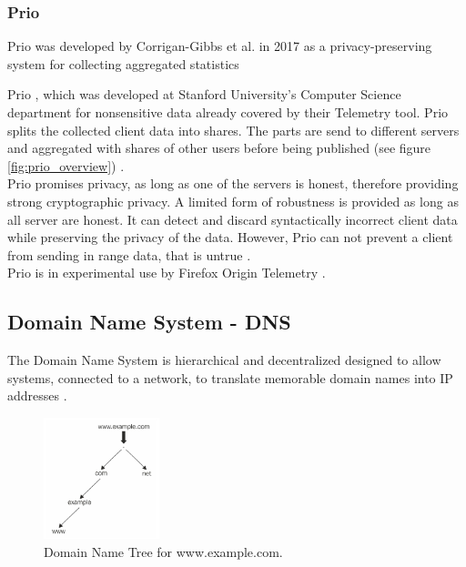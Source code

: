    \subsubsection{Prio}

        Prio was developed by Corrigan-Gibbs et al. \cite{corrigan-gibbs_prio_2017} in 2017 as a privacy-preserving
        system for collecting aggregated statistics
        
        Prio \cite{corrigan-gibbs_prio_2017}, which was developed at Stanford University's Computer Science department for nonsensitive data already covered by their Telemetry tool. 
        Prio splits the collected client data into shares. 
        The parts are send to different servers and aggregated with shares of other users before being published (see figure \ref{fig:prio_overview}) \cite{corrigan-gibbs_prio_2017}.\\
        Prio promises privacy, as long as one of the servers is honest, therefore providing strong cryptographic privacy. A limited form of robustness is provided as long as all server are honest. It can detect and discard syntactically incorrect client data while preserving the privacy of the data. However, Prio can not prevent a client from sending in range data, that is untrue \cite{corrigan-gibbs_prio_2017}.\\
        Prio is in experimental use by Firefox Origin Telemetry \cite{englehardt_next_2019}.
        
        
    \subsection{Domain Name System - DNS}
        \label{subsec:related:dns}
        The Domain Name System is hierarchical and decentralized designed to allow systems, connected to a network, to translate memorable domain names into IP addresses \cite{stevens_tcpip_1993}.\\
        \begin{figure}
            \includegraphics[width=0.3\textwidth]{latex/figures/domain_name_tree.jpg}
            \caption[Domain Name Tree for www.example.com.]{Domain Name Tree for www.example.com.  \cite{jeftovic_managing_2018}}
            \label{fig:dns_tree}
        \end{figure}
        
